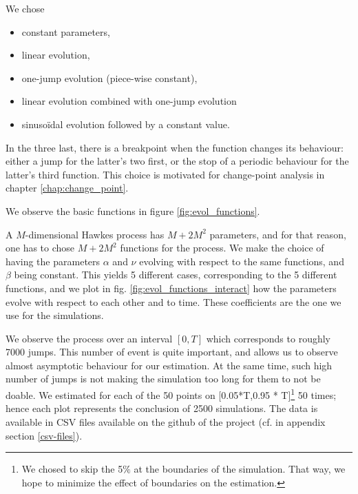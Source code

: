 \documentclass[11pt]{book}
\begin{document}
We chose 

\begin{itemize}
\item constant parameters, 
\item linear evolution, 
\item one-jump evolution (piece-wise constant), 
\item linear evolution combined with one-jump evolution 
\item sinusoïdal evolution followed by a constant value.
\end{itemize}

In the three last, there is a breakpoint when the function changes its behaviour: either a jump for the latter's two first, or the stop of a periodic behaviour for the latter's third function. This choice is motivated for change-point analysis in 
chapter \ref{chap:change_point}. 

We observe the basic functions in figure \ref{fig:evol_functions}.

A $M$-dimensional Hawkes process has $M+2M^2$ parameters, and for that reason, one has to chose $M+2M^2$ functions for the process. We make the choice of having the parameters $\alpha$ and $\nu$ evolving with respect to the same functions, and $\beta$ being constant. This yields 5 different cases, corresponding to the 5 different functions, and we plot in fig. \ref{fig:evol_functions_interact} how the parameters evolve with respect to each other and to time. These coefficients are the one we use for the simulations. 

We observe the process over an interval $[0,T]$ which corresponds to roughly 7000 jumps. This number of event is quite important, and allows us to observe almost asymptotic behaviour for our estimation. At the same time, such high number of jumps is not making the simulation too long for them to not be doable. We estimated for each of the 50 points on [0.05*T,0.95 * T]\footnote{We chosed to skip the 5$\%$ at the boundaries of the simulation. That way, we hope to minimize the effect of boundaries on the estimation.}  50 times; hence each plot represents the conclusion of 2500 simulations. The data is available in CSV files available on the github of the project (cf. in appendix section \ref{csv-files}).
\end{document}
